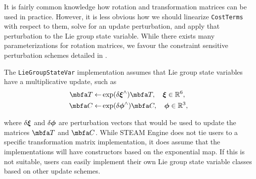 \documentclass[10pt,letterpaper,fleqn,oneside]{article}
\newcommand{\code}[1]{\texttt{#1}}
\begin{document}
It is fairly common knowledge how rotation and transformation matrices can be used in practice. However, it is less obvious how we should linearize \code{CostTerms} with respect to them, solve for an update perturbation, and apply that perturbation to the Lie group state variable.
While there exists many parameterizations for rotation matrices, we favour the constraint sensitive perturbation schemes detailed in \citet{barfoot_tro14}.

\noindent The \code{LieGroupStateVar} implementation assumes that Lie group state variables have a multiplicative update, such as
%
\begin{subequations}
\label{eq:lg_updates}
\begin{align}
\mbf{T} \leftarrow& \exp(\delta\mbs{\xi}^\wedge) \mbf{T}, \quad \mbs{\xi} \in \mathbb{R}^6, \\
\mbf{C} \leftarrow& \exp(\delta\mbs{\phi}^\wedge) \mbf{C}, \quad \mbs{\phi} \in \mathbb{R}^3,
\end{align}
\end{subequations}

%
where $\delta{\boldsymbol{\xi}}$ and $\delta{\boldsymbol{\phi}}$ are perturbation vectors that would be used to update the matrices $\mbf{T}$ and $\mbf{C}$.
While STEAM Engine does not tie users to a specific transformation matrix implementation, it does assume that the implementations will have constructors based on the exponential map. If this is not suitable, users can easily implement their own Lie group state variable classes based on other update schemes.
\end{document}
